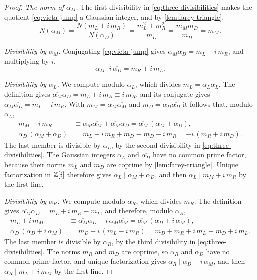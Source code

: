 \begin{proof}
\emph{The norm of $\alpha_M$.} The first divisibility in
\eqref{eq:three-divisibilities} makes the quotient \eqref{eq:vieta-jump} a
Gaussian integer, and by \cref{lem:farey-triangle},
$$
 N(\alpha_M)=\frac{N(m_L+i\,m_R)}{N(\alpha_D)}=\frac{m_L^2+m_R^2}{m_D}
 =\frac{m_Mm_D}{m_D}=m_M .
$$

\emph{Divisibility by $\alpha_M$.} Conjugating \eqref{eq:vieta-jump} gives
$\alpha_M\overline{\alpha_D}=m_L-i\,m_R$, and multiplying by $i$,
$$
 \alpha_M\cdot i\,\overline{\alpha_D}=m_R+i\,m_L .
$$

\emph{Divisibility by $\alpha_L$.} We compute modulo $\alpha_L$, which divides
$m_L=\alpha_L\overline{\alpha_L}$. The definition gives
$\overline{\alpha_M}\alpha_D=m_L+i\,m_R\equiv i\,m_R$, and its conjugate gives
$\alpha_M\overline{\alpha_D}=m_L-i\,m_R$. With $m_M=\alpha_M\overline{\alpha_M}$ and
$m_D=\alpha_D\overline{\alpha_D}$ it follows that, modulo $\alpha_L$,
\begin{align*}
 m_M+i\,m_R&\equiv\alpha_M\overline{\alpha_M}+\overline{\alpha_M}\alpha_D
 =\overline{\alpha_M}\,(\alpha_M+\alpha_D),\\
 \overline{\alpha_D}\,(\alpha_M+\alpha_D)&=m_L-i\,m_R+m_D\equiv m_D-i\,m_R
 =-i\,(m_R+i\,m_D).
\end{align*}
The last member is divisible by $\alpha_L$, by the second divisibility in
\eqref{eq:three-divisibilities}. The Gaussian integers $\alpha_L$ and
$\overline{\alpha_D}$ have no common prime factor, because their norms $m_L$ and
$m_D$ are coprime by \cref{lem:farey-triangle}. Unique factorization in $\mathbb{Z}[i]$
therefore gives $\alpha_L\mid\alpha_M+\alpha_D$, and then $\alpha_L\mid m_M+i\,m_R$
by the first line.

\emph{Divisibility by $\alpha_R$.} We compute modulo $\alpha_R$, which divides
$m_R$. The definition gives $\overline{\alpha_M}\alpha_D=m_L+i\,m_R\equiv m_L$,
and therefore, modulo $\alpha_R$,
\begin{align*}
 m_L+i\,m_M&\equiv\overline{\alpha_M}\alpha_D+i\,\alpha_M\overline{\alpha_M}
 =\overline{\alpha_M}\,(\alpha_D+i\,\alpha_M),\\
 \overline{\alpha_D}\,(\alpha_D+i\,\alpha_M)&=m_D+i\,(m_L-i\,m_R)
 =m_D+m_R+i\,m_L\equiv m_D+i\,m_L .
\end{align*}
The last member is divisible by $\alpha_R$, by the third divisibility in
\eqref{eq:three-divisibilities}. The norms $m_R$ and $m_D$ are coprime, so
$\alpha_R$ and $\overline{\alpha_D}$ have no common prime factor, and unique
factorization gives $\alpha_R\mid\alpha_D+i\,\alpha_M$, and then
$\alpha_R\mid m_L+i\,m_M$ by the first line.
\end{proof}

